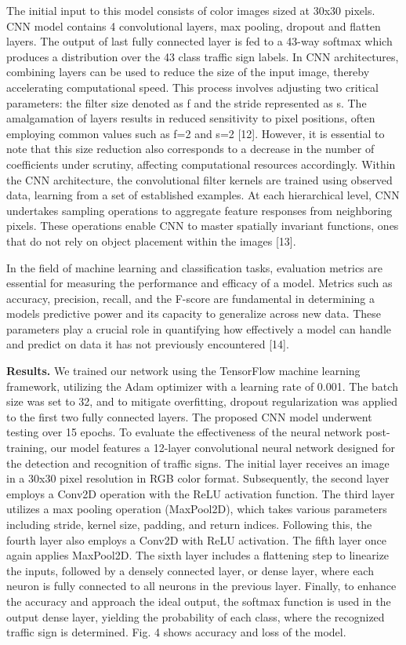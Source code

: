 The initial input to this model consists of color images sized at 30x30
pixels. CNN model contains 4 convolutional layers, max pooling, dropout
and flatten layers. The output of last fully connected layer is fed to a
43-way softmax which produces a distribution over the 43 class traffic
sign labels. In CNN architectures, combining layers can be used to
reduce the size of the input image, thereby accelerating computational
speed. This process involves adjusting two critical parameters: the
filter size denoted as \textquotesingle f\textquotesingle{} and the
stride represented as \textquotesingle s.\textquotesingle{} The
amalgamation of layers results in reduced sensitivity to pixel
positions, often employing common values such as f=2 and s=2 {[}12{]}.
However, it is essential to note that this size reduction also
corresponds to a decrease in the number of coefficients under scrutiny,
affecting computational resources accordingly. Within the CNN
architecture, the convolutional filter kernels are trained using
observed data, learning from a set of established examples. At each
hierarchical level, CNN undertakes sampling operations to aggregate
feature responses from neighboring pixels. These operations enable CNN
to master spatially invariant functions, ones that do not rely on object
placement within the images {[}13{]}.

In the field of machine learning and classification tasks, evaluation
metrics are essential for measuring the performance and efficacy of a
model. Metrics such as accuracy, precision, recall, and the F-score are
fundamental in determining a model\textquotesingle s predictive power
and its capacity to generalize across new data. These parameters play a
crucial role in quantifying how effectively a model can handle and
predict on data it has not previously encountered {[}14{]}.

\textbf{Results.} We trained our network using the TensorFlow machine
learning framework, utilizing the Adam optimizer with a learning rate of
0.001. The batch size was set to 32, and to mitigate overfitting,
dropout regularization was applied to the first two fully connected
layers. The proposed CNN model underwent testing over 15 epochs. To
evaluate the effectiveness of the neural network post-training, our
model features a 12-layer convolutional neural network designed for the
detection and recognition of traffic signs. The initial layer receives
an image in a 30x30 pixel resolution in RGB color format. Subsequently,
the second layer employs a Conv2D operation with the ReLU activation
function. The third layer utilizes a max pooling operation (MaxPool2D),
which takes various parameters including stride, kernel size, padding,
and return indices. Following this, the fourth layer also employs a
Conv2D with ReLU activation. The fifth layer once again applies
MaxPool2D. The sixth layer includes a flattening step to linearize the
inputs, followed by a densely connected layer, or dense layer, where
each neuron is fully connected to all neurons in the previous layer.
Finally, to enhance the accuracy and approach the ideal output, the
softmax function is used in the output dense layer, yielding the
probability of each class, where the recognized traffic sign is
determined. Fig. 4 shows accuracy and loss of the model.

